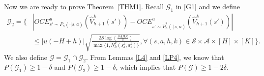 \documentclass[11pt]{article}
\newcommand{\1}{\mathbbm{1}}
\begin{document}
Now we are ready to prove Theorem~\ref{THM1}. Recall $\mathcal{G}_1$ in \eqref{G1} and we define
\begin{align*}
\mathcal{G}_2=\Bigg\{&\left\vert OCE^{u}_{s'\sim P_h(\cdot\vert s,a)}(\hat{V}_{h+1}^k(s'))-OCE^{u}_{s'\sim \hat{P}^k_h(\cdot\vert s,a)}(\hat{V}_{h+1}^k(s'))\right\vert\\ &\leq \vert u(-H+h)\vert\sqrt{\frac{2S\log\left (\frac{SAHK}{\delta}\right )}{\max\{1,N_h^k(s_h^k,a_h^k)\}}},\forall (s,a,h,k)\in \mathcal{S}\times \mathcal{A}\times [H]\times [K]\Bigg\}.
\end{align*}
We also define $\mathcal{G}=\mathcal{G}_1\cap \mathcal{G}_2$.
From Lemmas \ref{L4} and \ref{LP4}, we know that $P(\mathcal{G}_1)\geq 1-\delta$ and $P(\mathcal{G}_2)\geq 1-\delta$, which implies that $P(\mathcal{G})\geq 1-2\delta$.  %
\end{document}
